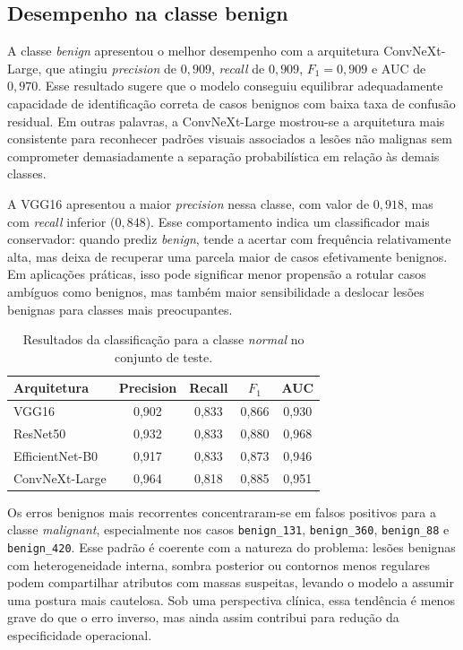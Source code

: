\documentclass[tcc,capa]{texufpel}
\begin{document}
\subsection{Desempenho na classe benign}

A classe \textit{benign} apresentou o melhor desempenho com a arquitetura ConvNeXt-Large, que atingiu \textit{precision} de \(0{,}909\), \textit{recall} de \(0{,}909\), \(F_1 = 0{,}909\) e AUC de \(0{,}970\). Esse resultado sugere que o modelo conseguiu equilibrar adequadamente capacidade de identificação correta de casos benignos com baixa taxa de confusão residual. Em outras palavras, a ConvNeXt-Large mostrou-se a arquitetura mais consistente para reconhecer padrões visuais associados a lesões não malignas sem comprometer demasiadamente a separação probabilística em relação às demais classes.

A VGG16 apresentou a maior \textit{precision} nessa classe, com valor de \(0{,}918\), mas com \textit{recall} inferior (\(0{,}848\)). Esse comportamento indica um classificador mais conservador: quando prediz \textit{benign}, tende a acertar com frequência relativamente alta, mas deixa de recuperar uma parcela maior de casos efetivamente benignos. Em aplicações práticas, isso pode significar menor propensão a rotular casos ambíguos como benignos, mas também maior sensibilidade a deslocar lesões benignas para classes mais preocupantes.

\begin{table}[h]
	\centering
	\caption{Resultados da classificação para a classe \textit{normal} no conjunto de teste.}
	\label{tab:resultados_normal}
	\begin{tabular}{lcccc}
		\hline
		\textbf{Arquitetura} & \textbf{Precision} & \textbf{Recall} & \textbf{\(F_1\)} & \textbf{AUC} \\
		\hline
		VGG16            & 0{,}902 & 0{,}833 & 0{,}866 & 0{,}930 \\
		ResNet50         & 0{,}932 & 0{,}833 & 0{,}880 & 0{,}968 \\
		EfficientNet-B0  & 0{,}917 & 0{,}833 & 0{,}873 & 0{,}946 \\
		ConvNeXt-Large   & 0{,}964 & 0{,}818 & 0{,}885 & 0{,}951 \\
		\hline
	\end{tabular}
\end{table}

Os erros benignos mais recorrentes concentraram-se em falsos positivos para a classe \textit{malignant}, especialmente nos casos \texttt{benign\_131}, \texttt{benign\_360}, \texttt{benign\_88} e \texttt{benign\_420}. Esse padrão é coerente com a natureza do problema: lesões benignas com heterogeneidade interna, sombra posterior ou contornos menos regulares podem compartilhar atributos com massas suspeitas, levando o modelo a assumir uma postura mais cautelosa. Sob uma perspectiva clínica, essa tendência é menos grave do que o erro inverso, mas ainda assim contribui para redução da especificidade operacional.
\end{document}
